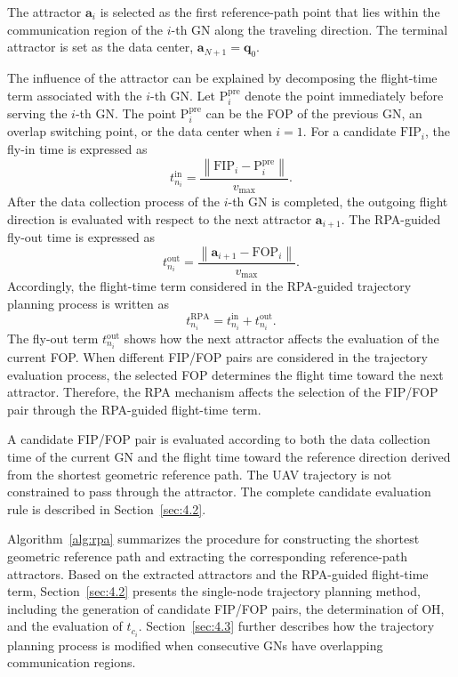 \documentclass[12pt]{ksthesis}
\begin{document}
\begin{thesis}
{    The attractor \(\mathbf{a}_i\) is selected as the first reference-path point that lies within the communication region of the \(i\)-th GN along the traveling direction. The terminal attractor is set as the data center, \(\mathbf{a}_{N+1}=\mathbf{q}_0\).

    The influence of the attractor can be explained by decomposing the flight-time term associated with the \(i\)-th GN. Let \(\mathrm{P}_i^{\mathrm{pre}}\) denote the point immediately before serving the \(i\)-th GN. The point \(\mathrm{P}_i^{\mathrm{pre}}\) can be the FOP of the previous GN, an overlap switching point, or the data center when \(i=1\). For a candidate \(\mathrm{FIP}_i\), the fly-in time is expressed as
    \begin{equation}
        t_{n_i}^{\mathrm{in}}=\frac{\left\|\mathrm{FIP}_i-\mathrm{P}_i^{\mathrm{pre}}\right\|}{v_{\max}}.
    \end{equation}
    After the data collection process of the \(i\)-th GN is completed, the outgoing flight direction is evaluated with respect to the next attractor \(\mathbf{a}_{i+1}\). The RPA-guided fly-out time is expressed as
    \begin{equation}
        t_{n_i}^{\mathrm{out}}=\frac{\left\|\mathbf{a}_{i+1}-\mathrm{FOP}_i\right\|}{v_{\max}}.
    \end{equation}
    Accordingly, the flight-time term considered in the RPA-guided trajectory planning process is written as
    \begin{equation}
        t_{n_i}^{\mathrm{RPA}}=t_{n_i}^{\mathrm{in}}+t_{n_i}^{\mathrm{out}}.
    \end{equation}
    The fly-out term \(t_{n_i}^{\mathrm{out}}\) shows how the next attractor affects the evaluation of the current FOP. When different FIP/FOP pairs are considered in the trajectory evaluation process, the selected FOP determines the flight time toward the next attractor. Therefore, the RPA mechanism affects the selection of the FIP/FOP pair through the RPA-guided flight-time term.

    A candidate FIP/FOP pair is evaluated according to both the data collection time of the current GN and the flight time toward the reference direction derived from the shortest geometric reference path. The UAV trajectory is not constrained to pass through the attractor. The complete candidate evaluation rule is described in Section~\ref{sec:4.2}.

    Algorithm~\ref{alg:rpa} summarizes the procedure for constructing the shortest geometric reference path and extracting the corresponding reference-path attractors. Based on the extracted attractors and the RPA-guided flight-time term, Section~\ref{sec:4.2} presents the single-node trajectory planning method, including the generation of candidate FIP/FOP pairs, the determination of OH, and the evaluation of \(t_{c_i}\). Section~\ref{sec:4.3} further describes how the trajectory planning process is modified when consecutive GNs have overlapping communication regions.

}
\end{thesis}
\end{document}
